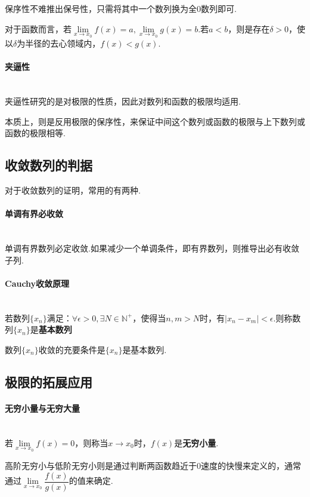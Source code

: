 \documentclass{ctexbook}
\begin{document}
	保序性不难推出保号性，只需将其中一个数列换为全0数列即可.
	
	对于函数而言，若$\lim\limits_{x \to x_0}f(x)=a,\lim\limits_{x \to x_0}g(x)=b$.若$a<b$，则是存在$\delta>0$，使以$\delta$为半径的去心领域内，$f(x)< g(x)$.
	
	\paragraph{夹逼性}~{}
	\\
	\indent
	夹逼性研究的是对极限的性质，因此对数列和函数的极限均适用.
	
	本质上，则是反用极限的保序性，来保证中间这个数列或函数的极限与上下数列或函数的极限相等.
	
	\subsection{收敛数列的判据}
	对于收敛数列的证明，常用的有两种.
	
	\paragraph{单调有界必收敛}~{}
	\\
	\indent
	单调有界数列必定收敛.如果减少一个单调条件，即有界数列，则推导出必有收敛子列.
	
	\paragraph{Cauchy收敛原理}~{}
	\\
	\indent
	若数列$\{x_n\}$满足：$\forall \epsilon>0,\exists N \in \mathbb{N^+}$，使得当$n,m>N$时，有$|x_n-x_m|<\epsilon$.则称数列$\{x_n\}$是\textbf{基本数列}
	
	数列$\{x_n\}$收敛的充要条件是$\{x_n\}$是基本数列.
	
	\subsection{极限的拓展应用}
	\paragraph{无穷小量与无穷大量}~{}
	\\
	\indent
	若$\lim\limits_{x \to x_0}f(x)=0$，则称当$x\to x_0$时，$f(x)$是\textbf{无穷小量}.
	
	高阶无穷小与低阶无穷小则是通过判断两函数趋近于0速度的快慢来定义的，通常通过$\lim\limits_{x \to x_0}\dfrac{f(x)}{g(x)}$的值来确定.
	
\end{document}
